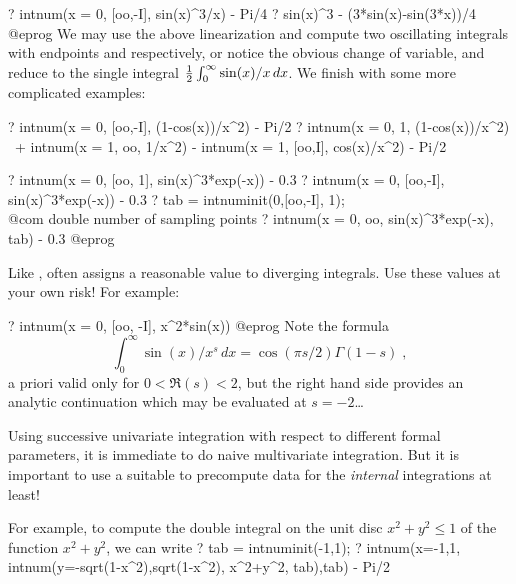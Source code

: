 ? intnum(x = 0, [oo,-I], sin(x)^3/x) - Pi/4
? sin(x)^3 - (3*sin(x)-sin(3*x))/4
@eprog\noindent
We may use the above linearization and compute two oscillating integrals with
endpoints \kbd{[oo, -I]} and \kbd{[oo, -3*I]} respectively, or
notice the obvious change of variable, and reduce to the single integral
${1\over 2}\int_0^\infty \sin(x)/x\,dx$. We finish with some more complicated
examples:

\bprog
? intnum(x = 0, [oo,-I], (1-cos(x))/x^2) - Pi/2
? intnum(x = 0, 1, (1-cos(x))/x^2) \
+ intnum(x = 1, oo, 1/x^2) - intnum(x = 1, [oo,I], cos(x)/x^2) - Pi/2

? intnum(x = 0, [oo, 1], sin(x)^3*exp(-x)) - 0.3
? intnum(x = 0, [oo,-I], sin(x)^3*exp(-x)) - 0.3
? tab = intnuminit(0,[oo,-I], 1); \\@com double number of sampling points
? intnum(x = 0, oo, sin(x)^3*exp(-x), tab) - 0.3
@eprog

 Like ,  often assigns a
reasonable value to diverging integrals. Use these values at your own risk!
For example:

\bprog
? intnum(x = 0, [oo, -I], x^2*sin(x))
@eprog\noindent
Note the formula
$$ \int_0^\infty \sin(x)/x^s\,dx = \cos(\pi s/2) \Gamma(1-s)\;, $$
a priori valid only for $0 < \Re(s) < 2$, but the right hand side provides an
analytic continuation which may be evaluated at $s = -2$\dots

Using successive univariate integration with respect to different formal
parameters, it is immediate to do naive multivariate integration. But it is
important to use a suitable \kbd{intnuminit} to precompute data for the
\emph{internal} integrations at least!

For example, to compute the double integral on the unit disc $x^2+y^2\le1$
of the function $x^2+y^2$, we can write
\bprog
? tab = intnuminit(-1,1);
? intnum(x=-1,1, intnum(y=-sqrt(1-x^2),sqrt(1-x^2), x^2+y^2, tab),tab) - Pi/2

